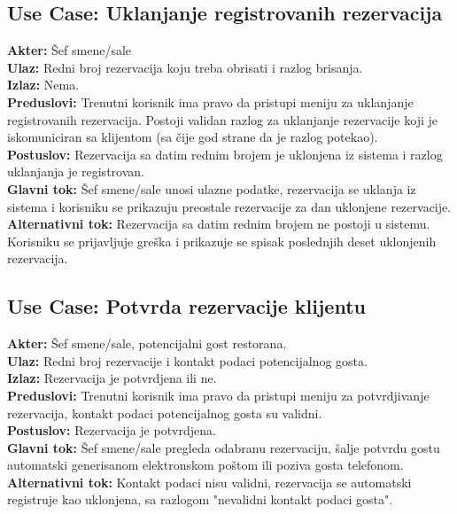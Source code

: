 \documentclass{article}
\begin{document}
\subsection{\textbf{Use Case}: Uklanjanje registrovanih rezervacija}
\textbf{Akter:} Šef smene/sale\\
\textbf{Ulaz:} Redni broj rezervacija koju treba obrisati i razlog brisanja.\\
\textbf{Izlaz:} Nema.\\
\textbf{Preduslovi:} Trenutni korisnik ima pravo da pristupi meniju za uklanjanje registrovanih rezervacija. Postoji validan razlog za uklanjanje rezervacije koji je iskomuniciran sa klijentom (sa čije god strane da je razlog potekao).\\
\textbf{Postuslov:} Rezervacija sa datim rednim brojem je uklonjena iz sistema i razlog uklanjanja je registrovan.\\
\textbf{Glavni tok:} Šef smene/sale unosi ulazne podatke, rezervacija se uklanja iz sistema i korisniku se prikazuju preostale rezervacije za dan uklonjene rezervacije.\\
\textbf{Alternativni tok:} Rezervacija sa datim rednim brojem ne postoji u sistemu. Korisniku se prijavljuje greška i prikazuje se spisak poslednjih deset uklonjenih rezervacija.\\

\subsection{\textbf{Use Case}: Potvrda rezervacije klijentu}
\textbf{Akter:} Šef smene/sale, potencijalni gost restorana.\\
\textbf{Ulaz:} Redni broj rezervacije i kontakt podaci potencijalnog gosta.\\
\textbf{Izlaz:} Rezervacija je potvrdjena ili ne.\\
\textbf{Preduslovi:} Trenutni korisnik ima pravo da pristupi meniju za potvrdjivanje rezervacija, kontakt podaci potencijalnog gosta su validni.\\
\textbf{Postuslov:} Rezervacija je potvrdjena.\\
\textbf{Glavni tok:} Šef smene/sale pregleda odabranu rezervaciju, šalje potvrdu gostu automatski generisanom elektronskom poštom ili poziva gosta telefonom.\\
\textbf{Alternativni tok:} Kontakt podaci nisu validni, rezervacija se automatski registruje kao uklonjena, sa razlogom "nevalidni kontakt podaci gosta".\\ \\
\end{document}
